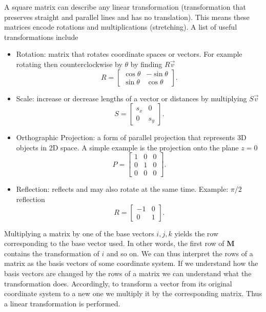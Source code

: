 \documentclass[a4paper,11pt]{amsart}
\begin{document}
A square matrix can describe any linear transformation (transformation that
preserves straight and parallel lines and has no translation). This means these
matrices encode rotations and multiplications (stretching). A list of useful
transformations include
\begin{itemize}
\item Rotation: matrix that rotates coordinate spaces or vectors. For example
    rotating then counterclockwise by $\theta$ by finding $R\vec v$
    \begin{equation}
    R = 
    \begin{bmatrix}\nonumber
        \cos{\theta} & -\sin{\theta}\\
        \sin{\theta} & \cos{\theta}
    \end{bmatrix}.
    \end{equation}
\item Scale: increase or decrease lengths of a vector or distances by
    multiplying $S \vec v$
    \begin{equation}
    S = 
    \begin{bmatrix}\nonumber
        s_x & 0\\
        0 & s_y
    \end{bmatrix}.
    \end{equation}
\item Orthographic Projection: a form of parallel projection that represents 3D
    objects in 2D space. A simple example is the projection onto the plane
    $z=0$
    \begin{equation}
    P = 
    \begin{bmatrix}\nonumber
        1 & 0 & 0\\
        0 & 1 & 0\\
        0 & 0 & 0
    \end{bmatrix}.
    \end{equation}
\item Reflection: reflects and may also rotate at the same time. Example: $\pi
    / 2$ reflection
    \begin{equation}
    R = 
    \begin{bmatrix}\nonumber
        -1 & 0\\
        0 & 1
    \end{bmatrix}.
    \end{equation}
\end{itemize}

Multiplying a matrix by one of the base vectors $i,j,k$ yields the row
corresponding to the base vector used. In other words, the first row of
\textbf{M} contains the transformation of $i$ and so on. We can thus interpret
the rows of a matrix as the basis vectors of some coordinate system. If we
understand how the basis vectors are changed by the rows of a matrix we can
understand what the transformation does. Accordingly, to transform a vector
from its original coordinate system to a new one we multiply it by the
corresponding matrix. Thus a linear transformation is performed.
\end{document}
